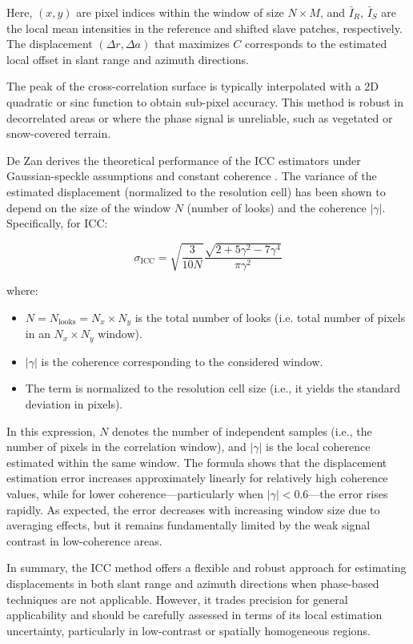 Here, $(x, y)$ are pixel indices within the window of size \(N \times M\), and $\bar{I}_R$, $\bar{I}_S$ are the local mean intensities in the reference and shifted slave patches, respectively. The displacement $(\Delta r, \Delta a)$ that maximizes $C$ corresponds to the estimated local offset in slant range and azimuth directions.

The peak of the cross-correlation surface is typically interpolated with a 2D quadratic or sinc function to obtain sub-pixel accuracy. This method is robust in decorrelated areas or where the phase signal is unreliable, such as vegetated or snow-covered terrain.

De Zan derives the theoretical performance of the ICC estimators under Gaussian-speckle assumptions and constant coherence \cite{DeZan2014}. The variance of the estimated displacement (normalized to the resolution cell) has been shown to depend on the size of the window \(N\) (number of looks) and the coherence \(|\gamma|\). Specifically, for ICC:

\[
\sigma_{\text{ICC}} = \sqrt{\frac{3}{10N}}\frac{\sqrt{2+5\gamma^2-7\gamma^4}}{\pi\gamma^2}
\label{eq:icc_crb}
\]

where:
\begin{itemize}
  \item \(N = N_{\text{looks}} = N_x \times N_y\) is the total number of looks (i.e. total number of pixels in an \(N_x \times N_y\) window).
  \item \(|\gamma|\) is the coherence corresponding to the considered window.
  \item The term is normalized to the resolution cell size (i.e., it yields the standard deviation in pixels).
\end{itemize}

In this expression, \(N\) denotes the number of independent samples (i.e., the number of pixels in the correlation window), and \(|\gamma|\) is the local coherence estimated within the same window. The formula shows that the displacement estimation error increases approximately linearly for relatively high coherence values, while for lower coherence—particularly when \(|\gamma| < 0.6\)—the error rises rapidly. As expected, the error decreases with increasing window size due to averaging effects, but it remains fundamentally limited by the weak signal contrast in low-coherence areas.

In summary, the ICC method offers a flexible and robust approach for estimating displacements in both slant range and azimuth directions when phase-based techniques are not applicable. However, it trades precision for general applicability and should be carefully assessed in terms of its local estimation uncertainty, particularly in low-contrast or spatially homogeneous regions.

